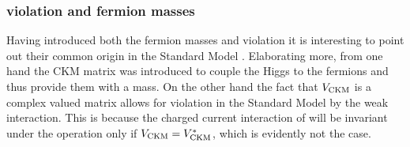 \subsubsection{\CP violation and fermion masses}
Having introduced both the fermion masses and \CP violation it is interesting to point out their common origin in
the Standard Model \cite{KM-mechanism}. Elaborating more, from one hand the CKM matrix was introduced to couple
the Higgs to the fermions and thus provide them with a mass. On the other hand the fact that $V_{\rm CKM}$ is a
complex valued matrix allows for \CP violation in the Standard Model by the weak interaction. This is because
the charged current interaction of  will be invariant under the \CP operation only
if $V_{\rm CKM}=V_{\rm CKM}^*$, which is evidently not the case.
